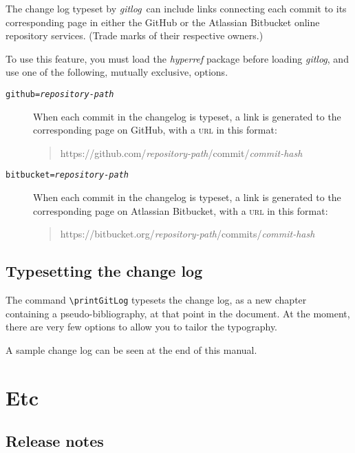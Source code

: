 \documentclass[a4paper,12pt,twoside,openany]{memoir}
\newcommand{\tcmd}[1]{\texttt{\textbackslash#1}}
\newcommand{\sfit}[1]{\textit{#1}}
\newcommand{\tpname}{\sfit{gitlog}}
\begin{document}
The change log typeset by \tpname\ can include links
connecting each commit to its corresponding page
in either the GitHub or the Atlassian Bitbucket 
online repository services. 
(Trade marks of their respective owners.)

To use this feature, you must load the \sfit{hyperref} package
before loading \tpname, and use one of the following, 
mutually exclusive, options.

\begin{description}

\item[\texttt{github=\textit{repository-path}}]
When each commit in the changelog is typeset,
a link is generated to the corresponding page on GitHub,
with a \textsc{url} in this format:
\begin{quote}
{\ttfamily\small
https://github.com/{\rmfamily\itshape repository-path}/commit/{\rmfamily\itshape commit-hash}
}
\end{quote}

\item[\texttt{bitbucket=\textit{repository-path}}]
When each commit in the changelog is typeset,
a link is generated to the corresponding page on Atlassian Bitbucket,
with a \textsc{url} in this format:
\begin{quote}
{\ttfamily\small
https://bitbucket.org/{\rmfamily\itshape repository-path}/commits/{\rmfamily\itshape commit-hash}
}
\end{quote}

\end{description}

\section{Typesetting the change log}

The command \tcmd{printGitLog}
typesets the change log, as a new chapter containing a pseudo-bibliography,
at that point in the document. 
At the moment, there are very few options to allow you to tailor the typography.

A sample change log can be seen at the end of this manual.

\chapter{Etc}
\section{Release notes}
\end{document}
